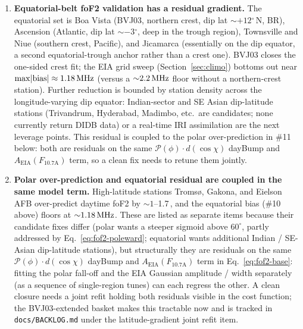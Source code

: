 \documentclass[11pt,a4paper]{article}
\newcommand{\SI}[2]{#1\,\text{#2}}
\newcommand{\MHz}{\text{MHz}}
\newcommand{\degree}{\ensuremath{{}^\circ}}
\begin{document}
\begin{enumerate}[leftmargin=*]
  \item \textbf{Equatorial-belt foF2 validation has a residual
        gradient.}  The equatorial set is Boa Vista (BVJ03,
        northern crest, dip lat ${\sim}+12\degree$\,N, BR),
        Ascension (Atlantic, dip lat ${\sim}-3\degree$, deep in
        the trough region), Townsville and Niue (southern crest,
        Pacific), and Jicamarca (essentially on the dip equator,
        a second equatorial-trough anchor rather than a crest
        one). BVJ03 closes the one-sided crest fit;
        the EIA grid sweep (Section~\ref{sec:climo}) bottoms
        out near $\max\!|\text{bias}| \approx \SI{1.18}{\MHz}$
        (versus a ${\sim}\SI{2.2}{\MHz}$ floor without a
        northern-crest station).
        Further reduction is bounded by station density across
        the longitude-varying dip equator: Indian-sector and SE
        Asian dip-latitude stations (Trivandrum, Hyderabad,
        Madimbo, etc.\ are candidates; none currently return
        DIDB data) or a real-time IRI assimilation are the next
        leverage points.  This residual is coupled to the polar
        over-prediction in \#11 below: both are residuals on the
        same $\mathcal{P}(\phi)\cdot d(\cos\chi)$ dayBump and
        $A_{\text{EIA}}(F_{10.7\text{A}})$ term, so a clean fix
        needs to retune them jointly.

  \item \textbf{Polar over-prediction and equatorial residual are
        coupled in the same model term.}  High-latitude stations
        Tromsø, Gakona, and Eielson AFB over-predict daytime foF2
        by ${\sim}1$--\SI{1.7}{\MHz}, and the equatorial bias
        (\#10 above) floors at ${\sim}\SI{1.18}{\MHz}$.
        These are listed as separate items because their candidate
        fixes differ (polar wants a steeper sigmoid above
        $60^\circ$, partly addressed by
        Eq.~\ref{eq:fof2-poleward}; equatorial wants additional
        Indian / SE-Asian dip-latitude stations), but structurally
        they are residuals on the same
        $\mathcal{P}(\phi) \cdot d(\cos\chi)$ dayBump and
        $A_{\text{EIA}}(F_{10.7\text{A}})$ term in
        Eq.~\ref{eq:fof2-base}: fitting the polar fall-off and
        the EIA Gaussian amplitude / width separately (as a
        sequence of single-region tunes) can each regress the
        other.  A clean closure needs a joint refit holding both
        residuals visible in the cost function; the
        BVJ03-extended basket makes this tractable now and is
        tracked in \texttt{docs/BACKLOG.md} under the
        latitude-gradient joint refit item.


\end{enumerate}
\end{document}

